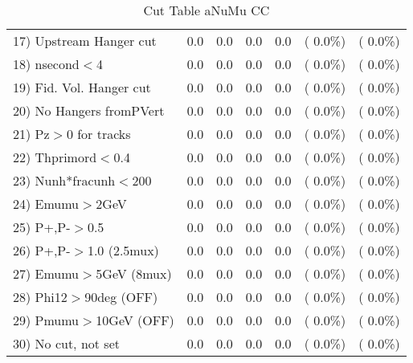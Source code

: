 \begin{table}[h!]
\begin{tabular}{||l||r|r|r|r|r|r||}
 17) Upstream Hanger cut  &          0.0 &          0.0 &          0.0 &          0.0 & (  0.0\%) & (  0.0\%) \\
 18) nsecond$<$4          &          0.0 &          0.0 &          0.0 &          0.0 & (  0.0\%) & (  0.0\%) \\
 19) Fid. Vol. Hanger cut &          0.0 &          0.0 &          0.0 &          0.0 & (  0.0\%) & (  0.0\%) \\
 20) No Hangers fromPVert &          0.0 &          0.0 &          0.0 &          0.0 & (  0.0\%) & (  0.0\%) \\
 21) Pz$>$0 for tracks    &          0.0 &          0.0 &          0.0 &          0.0 & (  0.0\%) & (  0.0\%) \\
 22) Thprimord$<$0.4      &          0.0 &          0.0 &          0.0 &          0.0 & (  0.0\%) & (  0.0\%) \\
 23) Nunh*fracunh$<$200   &          0.0 &          0.0 &          0.0 &          0.0 & (  0.0\%) & (  0.0\%) \\
 24) Emumu$>$2GeV         &          0.0 &          0.0 &          0.0 &          0.0 & (  0.0\%) & (  0.0\%) \\
 25) P+,P-$>$0.5          &          0.0 &          0.0 &          0.0 &          0.0 & (  0.0\%) & (  0.0\%) \\
 26) P+,P-$>$1.0 (2.5mux) &          0.0 &          0.0 &          0.0 &          0.0 & (  0.0\%) & (  0.0\%) \\
 27) Emumu$>$5GeV  (8mux) &          0.0 &          0.0 &          0.0 &          0.0 & (  0.0\%) & (  0.0\%) \\
 28) Phi12$>$90deg  (OFF) &          0.0 &          0.0 &          0.0 &          0.0 & (  0.0\%) & (  0.0\%) \\
 29) Pmumu$>$10GeV  (OFF) &          0.0 &          0.0 &          0.0 &          0.0 & (  0.0\%) & (  0.0\%) \\
 30) No cut, not set      &          0.0 &          0.0 &          0.0 &          0.0 & (  0.0\%) & (  0.0\%) \\
 \hline
 \hline
 \end{tabular}
 \caption{Cut Table  aNuMu CC }
 \label{tab-cutcohjpsi-mumu_res}
 \end{table}
